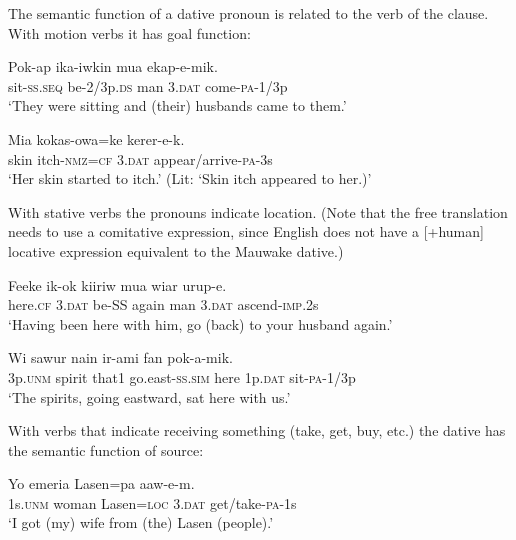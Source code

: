The semantic function of a dative pronoun is related to the verb of the clause. With motion verbs it has goal function: 

\ea%
\label{ex:3:x1781}
\gll Pok-ap ika-iwkin mua  ekap-e-mik. \\
sit-\textsc{ss}.\textsc{seq} be-2/3p.\textsc{ds} man 3.\textsc{dat} come-\textsc{pa}-1/3p\\
\glt`They were sitting and (their) husbands came to them.'
\z

\ea%
\label{ex:3:x580}
\gll Mia kokas-owa=ke  kerer-e-k. \\
skin itch-\textsc{nmz}=\textsc{cf} 3.\textsc{dat} appear/arrive-\textsc{pa}-3s\\
\glt`Her skin started to itch.' (Lit: `Skin itch appeared to her.)' 
\z

With stative verbs the pronouns indicate location. (Note that the free translation needs to use a comitative expression, since English does not have a [+human] locative expression equivalent to the Mauwake dative.) 

\ea%
\label{ex:3:x1782}
\gll Feeke  ik-ok kiiriw mua wiar urup-e. \\
here.\textsc{cf} 3.\textsc{dat} be-SS again man 3.\textsc{dat} ascend-\textsc{imp}.2s\\
\glt`Having been here with him, go (back) to your husband again.'
\z

\ea%
\label{ex:3:x1783}
\gll Wi sawur nain ir-ami fan  pok-a-mik.{\footnotemark} \\
3p.\textsc{unm} spirit that1 go.east-\textsc{ss}.\textsc{sim} here 1p.\textsc{dat} sit-\textsc{pa}-1/3p\\
\glt`The spirits, going eastward, sat here with us.'
\z


With verbs that indicate receiving something (take, get, buy, etc.) the dative has the semantic function of source:

\ea%
\label{ex:3:x579}
\gll Yo emeria Lasen=pa  aaw-e-m. \\
1s.\textsc{unm} woman Lasen=\textsc{loc} 3.\textsc{dat} get/take-\textsc{pa}-1s\\
\glt`I got (my) wife from (the) Lasen (people).'
\z

